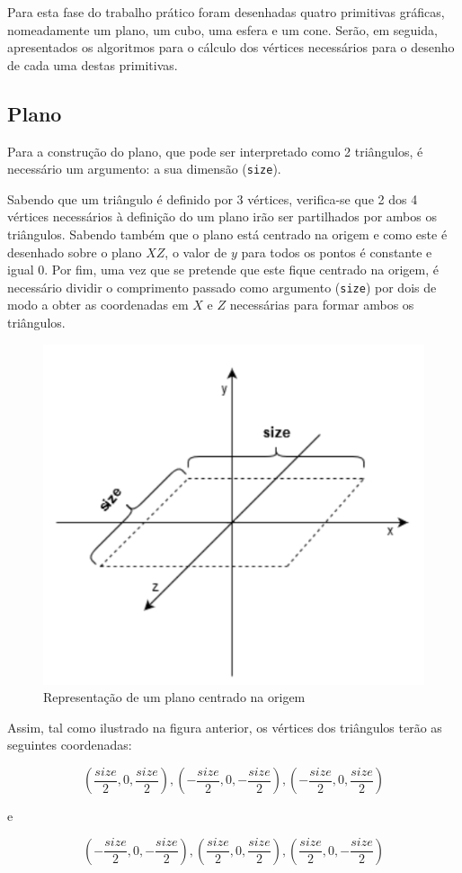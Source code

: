 \documentclass[a4paper, 11pt]{article}
\begin{document}
Para esta fase do trabalho prático foram desenhadas quatro primitivas gráficas, nomeadamente um 
plano, um cubo, uma esfera e um cone. Serão, em seguida, apresentados os algoritmos para o cálculo
dos vértices necessários para o desenho de cada uma destas primitivas.

\subsection{Plano}

Para a construção do plano, que pode ser interpretado como 2 triângulos, é necessário um 
argumento: a sua dimensão
(\texttt{size}).

Sabendo que um triângulo é definido por 3 vértices, verifica-se que 2 dos 4 vértices 
necessários à definição do um plano irão ser partilhados por ambos os triângulos. Sabendo também
que o plano está centrado na origem e como este é desenhado sobre o plano $XZ$, o valor de $y$ para
todos os pontos é constante e igual 0. Por fim, uma vez que se pretende que este
fique centrado na origem, é necessário dividir o comprimento passado como argumento 
(\texttt{size}) por dois de modo a obter as coordenadas em $X$ e $Z$ necessárias para formar
ambos os triângulos.

\begin{figure}[H]
    \centering
    \includegraphics[width=.5\textwidth]{img/plane.png}
    \caption{Representação de um plano centrado na origem}
\end{figure}

Assim, tal como ilustrado na figura anterior, os vértices dos triângulos terão as seguintes
coordenadas:

$$\left(\frac{size}{2}, 0, \frac{size}{2}\right), \left(-\frac{size}{2}, 0, -\frac{size}{2}\right), 
\left(-\frac{size}{2}, 0, \frac{size}{2}\right)$$

\noindent e

$$\left(-\frac{size}{2}, 0, -\frac{size}{2}\right), \left(\frac{size}{2}, 0, \frac{size}{2}\right), 
\left(\frac{size}{2}, 0, -\frac{size}{2}\right)$$
\end{document}
